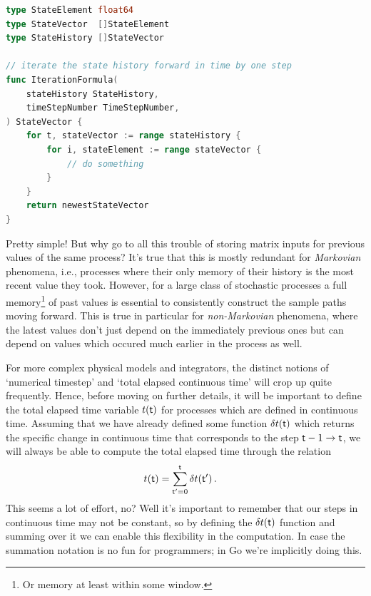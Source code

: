 \documentclass{book}
\begin{document}
\begin{lstlisting}[language=Go]
type StateElement float64
type StateVector  []StateElement
type StateHistory []StateVector

// iterate the state history forward in time by one step
func IterationFormula(
    stateHistory StateHistory, 
    timeStepNumber TimeStepNumber,
) StateVector {
    for t, stateVector := range stateHistory {
        for i, stateElement := range stateVector {
            // do something
        }
    }
    return newestStateVector
}
\end{lstlisting}

Pretty simple! But why go to all this trouble of storing matrix inputs for previous values of the same process? It's true that this is mostly redundant for \emph{Markovian} phenomena, i.e., processes where their only memory of their history is the most recent value they took. However, for a large class of stochastic processes a full memory\footnote{Or memory at least within some window.} of past values is essential to consistently construct the sample paths moving forward. This is true in particular for \emph{non-Markovian} phenomena, where the latest values don't just depend on the immediately previous ones but can depend on values which occured much earlier in the process as well.

For more complex physical models and integrators, the distinct notions of `numerical timestep' and `total elapsed continuous time' will crop up quite frequently. Hence, before moving on further details, it will be important to define the total elapsed time variable $t({\sf t})$ for processes which are defined in continuous time. Assuming that we have already defined some function $\delta t({\sf t})$ which returns the specific change in continuous time that corresponds to the step ${\sf t}-1 \rightarrow {\sf t}$, we will always be able to compute the total elapsed time through the relation
\begin{align}
t({\sf t}) &= \sum^{{\sf t}}_{{\sf t}'=0}\delta t({\sf t}') \label{eq:t-steps-sum} \,.
\end{align}
This seems a lot of effort, no? Well it's important to remember that our steps in continuous time may not be constant, so by defining the $\delta t({\sf t})$ function and summing over it we can enable this flexibility in the computation. In case the summation notation is no fun for programmers; in Go we're implicitly doing this.
\end{document}
